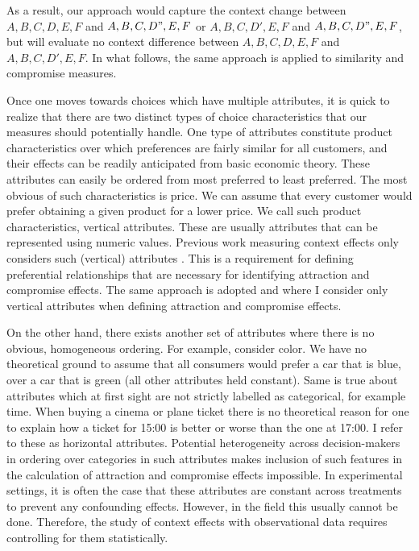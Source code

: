 \documentclass[a4paper,12pt]{article}
\begin{document}
As a result, our approach would capture the context change between ${A, B, C, D, E, F}$ and ${A, B, C, D", E, F}$ or ${A, B, C, D', E, F}$ and ${A, B, C, D", E, F}$, but will evaluate no context difference between ${A, B, C, D, E, F}$ and ${A, B, C, D', E, F}$. In what follows, the same approach is applied to similarity and compromise measures.

Once one moves towards choices which have multiple attributes, it is quick to realize that there are two distinct types of choice characteristics that our measures should potentially handle. One type of attributes constitute product characteristics over which preferences are fairly similar for all customers, and their effects can be readily anticipated from basic economic theory. These attributes can easily be ordered from most preferred to least preferred. The most obvious of such characteristics is price. We can assume that every customer would prefer obtaining a given product for a lower price. We call such product characteristics, vertical attributes. These are usually attributes that can be represented using numeric values. Previous work measuring context effects only considers such (vertical) attributes \citep{trueblood2014multiattribute, noguchi2018multialternative, noguchi2014attraction}. This is a requirement for defining preferential relationships that are necessary for identifying attraction and compromise effects. The same approach is adopted and where I consider only vertical attributes when defining attraction and compromise effects.

On the other hand, there exists another set of attributes where there is no obvious, homogeneous ordering. For example, consider color. We have no theoretical ground to assume that all consumers would prefer a car that is blue, over a car that is green (all other attributes held constant). Same is true about attributes which at first sight are not strictly labelled as categorical, for example time. When buying a cinema or plane ticket there is no theoretical reason for one to explain how a ticket for 15:00 is better or worse than the one at 17:00.  I refer to these as horizontal attributes. Potential heterogeneity across decision-makers in ordering over categories in such attributes makes inclusion of such features in the calculation of attraction and compromise effects impossible. In experimental settings, it is often the case that these attributes are constant across treatments to prevent any confounding effects. However, in the field this usually cannot be done. Therefore, the study of context effects with observational data requires controlling for them statistically. 
\end{document}
